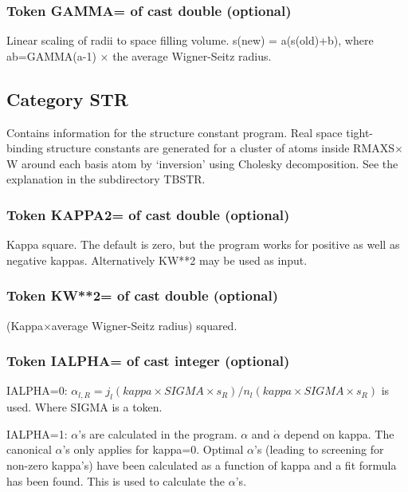 \documentclass[aps,twocolumn,a4]{revtex4}
\begin{document}
\subsubsection{Token GAMMA= of cast double (optional)}
Linear scaling of radii to space filling volume. s(new) = a(s(old)+b),
where ab=GAMMA(a-1) $\times $ the average Wigner-Seitz radius.

\subsection{Category STR}
Contains information for the structure constant program.
Real space tight-binding structure constants are generated for a cluster
of atoms inside RMAXS$\times $W around each basis atom by `inversion'
using Cholesky decomposition. See the explanation in the subdirectory
TBSTR.


\subsubsection{Token KAPPA2= of cast double (optional)}
Kappa square.  The default is zero, but the program works
for positive as well as negative kappas.  Alternatively KW**2 may be
used as input.

\subsubsection{Token KW**2= of cast double (optional)}
(Kappa$\times $average Wigner-Seitz radius) squared.

\subsubsection{Token IALPHA= of cast integer (optional)}
IALPHA=0: $\alpha _{l,R}=
j_l(kappa\times SIGMA\times s_R) /
n_l(kappa\times SIGMA\times s_R) $
is used. Where SIGMA is a token.

IALPHA=1: $\alpha $'s are calculated in the program.
$\alpha $ and $\dot \alpha $ depend on kappa.
The canonical $\alpha $'s only applies for kappa=0.  Optimal $\alpha $'s
(leading to screening for non-zero kappa's) have been calculated
as a function of kappa and a fit formula has been found.  This is used
to calculate the $\alpha $'s.
\end{document}
